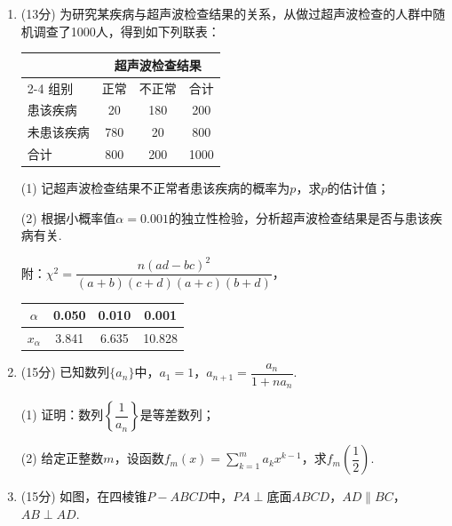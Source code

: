 \documentclass[12pt,a4paper]{article}
\begin{document}
	\vspace{0.3cm}
	
	
	\begin{enumerate}[leftmargin=*,label=\arabic*.,resume,itemsep=1.2ex]
		\item (13分) 为研究某疾病与超声波检查结果的关系，从做过超声波检查的人群中随机调查了1000人，得到如下列联表：
		
		\begin{center}
			\begin{tabular}{lccc}
				\toprule
				& \multicolumn{3}{c}{超声波检查结果} \\
				\cmidrule{2-4}
				组别 & 正常 & 不正常 & 合计 \\
				\midrule
				患该疾病 & 20 & 180 & 200 \\
				未患该疾病 & 780 & 20 & 800 \\
				合计 & 800 & 200 & 1000 \\
				\bottomrule
			\end{tabular}
		\end{center}
		
		(1) 记超声波检查结果不正常者患该疾病的概率为$p$，求$p$的估计值；
		
		(2) 根据小概率值$\alpha=0.001$的独立性检验，分析超声波检查结果是否与患该疾病有关. 
		
		附：$\chi^2=\dfrac{n(ad-bc)^2}{(a+b)(c+d)(a+c)(b+d)}$，
		
		\begin{center}
			\begin{tabular}{c|ccc}
				$\alpha$ & 0.050 & 0.010 & 0.001 \\
				\hline
				$x_\alpha$ & 3.841 & 6.635 & 10.828 \\
			\end{tabular}
		\end{center}
		
		\item (15分) 已知数列$\{a_n\}$中，$a_1=1$，$a_{n+1}=\dfrac{a_n}{1+na_n}$. 
		
		(1) 证明：数列$\left\{\dfrac{1}{a_n}\right\}$是等差数列；
		
		(2) 给定正整数$m$，设函数$f_m(x)=\sum_{k=1}^m a_kx^{k-1}$，求$f_m\left(\dfrac{1}{2}\right)$. 
		
		\item (15分) 如图，在四棱锥$P-ABCD$中，$PA\perp$底面$ABCD$，$AD\parallel BC$，$AB\perp AD$. 
		

\end{enumerate}
\end{document}
